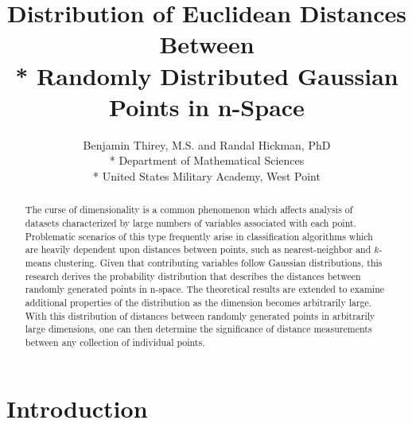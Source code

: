 \documentclass[11pt]{article} %
\title{Distribution of Euclidean Distances Between \\* Randomly Distributed Gaussian Points in n-Space}
\author{Benjamin Thirey, M.S. and Randal Hickman, PhD \\*
Department of Mathematical Sciences \\*
United States Military Academy, West Point}
\date{} %
\begin{document}
\maketitle

\begin{abstract}
The curse of dimensionality is a common phenomenon which affects analysis of datasets characterized by large numbers of variables associated with each point.  Problematic scenarios of this type frequently arise in classification algorithms which are heavily dependent upon distances between points, such as nearest-neighbor and $k$-means clustering.  Given that contributing variables follow Gaussian distributions, this research derives the probability distribution that describes the distances between randomly generated points in n-space. The theoretical results are extended to examine additional properties of the distribution as the dimension becomes arbitrarily large.  With this distribution of distances between randomly generated points in arbitrarily large dimensions, one can then determine the significance of distance measurements between any collection of individual points. 
\end{abstract}

\section{Introduction}
\end{document}
